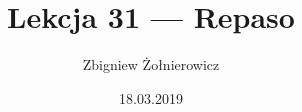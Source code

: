 \documentclass{article}
\begin{document}
    \title{Lekcja 31 --- Repaso}
    \author{Zbigniew Żołnierowicz}
    \date{18.03.2019}
    \maketitle
\end{document}
